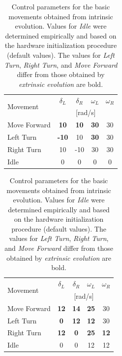 \begin{table}
\centering
{}
\renewcommand{\arraystretch}{1.7}
\begin{tabular}{l|cccc}
\hline
\multirow{2}{*}{Movement} & $\delta_L$ & $\delta_R$ & $\omega_L$ & $\omega_R$  \\
  & \multicolumn{4}{c}{[rad/s]}\\
\hline
\rowcolor{Gray}
Move Forward & \textbf{10} & \textbf{10} & \textbf{30} & 30 \\
Left Turn & \textbf{-10} & 10 & \textbf{30} & 30 \\
\rowcolor{Gray}
Right Turn & 10 & -10 & 30 & 30 \\
Idle & 0 & 0 & 0 & 0 \\
\hline
\end{tabular}
\newline
\caption[Control parameters for the basic movements - extrinsic evolution]{Control parameters for the basic movements obtained from extrinsic evolution. The values that differ from those obtained by \textit{intrinsic evolution} are bold. Values for \textit{Idle} (which simply stops the actuators) were not evolved. \newline \newline}
\label{tab-ctrl-values-extrinsic}
\endminipage\hfill
{}
\renewcommand{\arraystretch}{1.7}
\begin{tabular}{l|cccc}
\hline
\multirow{2}{*}{Movement} & $\delta_L$ & $\delta_R$ & $\omega_L$ & $\omega_R$  \\
  & \multicolumn{4}{c}{[rad/s]}\\
\hline
\rowcolor{Gray}
Move Forward & \textbf{12} & \textbf{14} & \textbf{25} & 30 \\
Left Turn & \textbf{0} & \textbf{12} & \textbf{12} & 30 \\
\rowcolor{Gray}
Right Turn & \textbf{12} & \textbf{0} & \textbf{25} & \textbf{12} \\
Idle & 0 & 0 & 12 & 12 \\
\hline
\end{tabular}
\newline
\caption[Control parameters for the basic movements - intrinsic evolution]{Control parameters for the basic movements obtained from intrinsic evolution. Values for \textit{Idle} were determined empirically and based on the hardware initialization procedure (default values). The values for \textit{Left Turn}, \textit{Right Turn}, and \textit{Move Forward} differ from those obtained by \textit{extrinsic evolution} are bold.}
\label{tab-ctrl-values-intrinsic}
\endminipage\hfill
\end{table}

